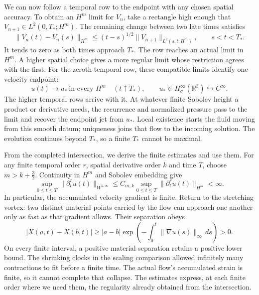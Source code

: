 We can now follow a temporal row to the endpoint with any chosen spatial
accuracy. To obtain an \(H^m\) limit for \(V_n\), take a rectangle high
enough that \(V_{n+1}\in L^2(0,T_*;H^m)\). The remaining change between
two late times satisfies
\[
 \|V_n(t)-V_n(s)\|_{H^m}
 \le (t-s)^{1/2}\|V_{n+1}\|_{L^2(s,t;H^m)},
 \qquad s<t<T_*.
\]
It tends to zero as both times approach \(T_*\). The row reaches an actual
limit in \(H^m\). A higher spatial choice gives a more regular limit whose
restriction agrees with the first. For the zeroth temporal row, these
compatible limits identify one velocity endpoint:
\[
 u(t)\longrightarrow u_*\ \text{in every }H^m\quad(t\uparrow T_*),
 \qquad u_*\in H^\infty_\sigma(\mathbb R^3)\hookrightarrow C^\infty.
\]
The higher temporal rows arrive with it. At whatever finite Sobolev height
a product or derivative needs, the recurrence and normalized pressure pass
to the limit and recover the endpoint jet from \(u_*\). Local existence
starts the fluid moving from this smooth datum; uniqueness joins that flow
to the incoming solution. The evolution continues beyond \(T_*\), so a
finite \(T_*\) cannot be maximal.

From the completed intersection, we derive the finite estimates and use
them. For any finite temporal order \(r\), spatial derivative order \(k\)
and time \(T\), choose \(m>k+\tfrac32\). Continuity in \(H^m\) and
Sobolev embedding give
\[
 \sup_{0\le t\le T}\|\partial_t^ru(t)\|_{W^{k,\infty}}
 \le C_{m,k}\sup_{0\le t\le T}\|\partial_t^ru(t)\|_{H^m}<\infty.
\]
In particular, the accumulated velocity gradient is finite. Return to the
stretching vortex: two distinct material points carried by the flow can
approach one another only as fast as that gradient allows. Their separation
obeys
\[
 |X(a,t)-X(b,t)|\ge |a-b|
 \exp\!\left(-\int_0^t\|\nabla u(s)\|_\infty\,ds\right)>0.
\]
On every finite interval, a positive material separation retains a positive
lower bound. The shrinking clocks in the scaling comparison allowed
infinitely many contractions to fit before a finite time. The actual flow's
accumulated strain is finite, so it cannot complete that collapse. The
estimates express, at each finite order where we need them, the regularity
already obtained from the intersection.
\endgroup

